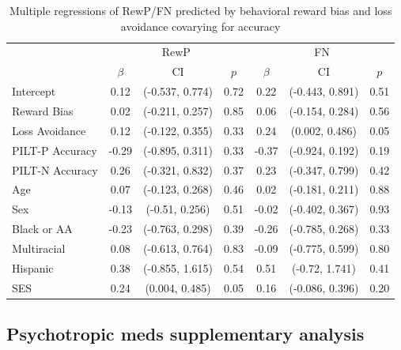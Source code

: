 \documentclass[english,man,floatsintext]{apa6}
\begin{document}
\begin{table}[tbp]

\begin{center}
\begin{threeparttable}

\caption{\label{tab:unnamed-chunk-9}Multiple regressions of RewP/FN predicted by behavioral reward bias and loss avoidance covarying for accuracy}

\begin{tabular}{lcccccc}
\toprule
 \multicolumn{1}{c}{ } & \multicolumn{3}{c}{RewP} & \multicolumn{3}{c}{FN} \\
\cmidrule(r){1-1} \cmidrule(r){2-4} \cmidrule(r){5-7}
  & $\beta$ & CI & $p$ & $\beta$ & CI & $p$\\
\midrule
Intercept & 0.12 & (-0.537, 0.774) & 0.72 & 0.22 & (-0.443, 0.891) & 0.51\\
Reward Bias & 0.02 & (-0.211, 0.257) & 0.85 & 0.06 & (-0.154, 0.284) & 0.56\\
Loss Avoidance & 0.12 & (-0.122, 0.355) & 0.33 & 0.24 & (0.002, 0.486) & 0.05\\
PILT-P Accuracy & -0.29 & (-0.895, 0.311) & 0.33 & -0.37 & (-0.924, 0.192) & 0.19\\
PILT-N Accuracy & 0.26 & (-0.321, 0.832) & 0.37 & 0.23 & (-0.347, 0.799) & 0.42\\
Age & 0.07 & (-0.123, 0.268) & 0.46 & 0.02 & (-0.181, 0.211) & 0.88\\
Sex & -0.13 & (-0.51, 0.256) & 0.51 & -0.02 & (-0.402, 0.367) & 0.93\\
Black or AA & -0.23 & (-0.763, 0.298) & 0.39 & -0.26 & (-0.785, 0.268) & 0.33\\
Multiracial & 0.08 & (-0.613, 0.764) & 0.83 & -0.09 & (-0.775, 0.599) & 0.80\\
Hispanic & 0.38 & (-0.855, 1.615) & 0.54 & 0.51 & (-0.72, 1.741) & 0.41\\
SES & 0.24 & (0.004, 0.485) & 0.05 & 0.16 & (-0.086, 0.396) & 0.20\\
\bottomrule
\end{tabular}

\end{threeparttable}
\end{center}

\end{table}

\hypertarget{psychotropic-meds-supplementary-analysis}{%
\subsection{Psychotropic meds supplementary analysis}\label{psychotropic-meds-supplementary-analysis}}
\end{document}
